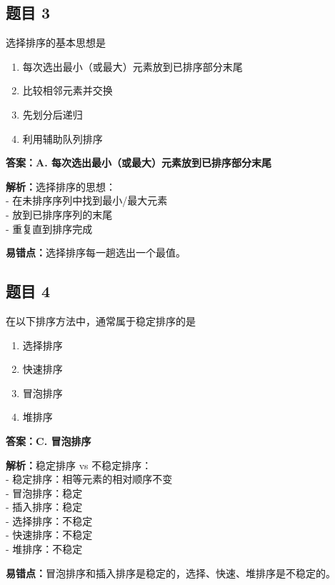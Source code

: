 \documentclass[12pt,a4paper]{ctexart}
\begin{document}
\subsection*{题目 3}
选择排序的基本思想是
\begin{enumerate}[label=\Alph*.]
	\item 每次选出最小（或最大）元素放到已排序部分末尾
	\item 比较相邻元素并交换
	\item 先划分后递归
	\item 利用辅助队列排序
\end{enumerate}

\begin{answerbox}
	\textbf{答案：A. 每次选出最小（或最大）元素放到已排序部分末尾}

	\textbf{解析：}选择排序的思想：\\
	- 在未排序序列中找到最小/最大元素\\
	- 放到已排序序列的末尾\\
	- 重复直到排序完成

	\textbf{易错点：}选择排序每一趟选出一个最值。
\end{answerbox}

\subsection*{题目 4}
在以下排序方法中，通常属于稳定排序的是
\begin{enumerate}[label=\Alph*.]
	\item 选择排序
	\item 快速排序
	\item 冒泡排序
	\item 堆排序
\end{enumerate}

\begin{answerbox}
	\textbf{答案：C. 冒泡排序}

	\textbf{解析：}稳定排序 vs 不稳定排序：\\
	- 稳定排序：相等元素的相对顺序不变\\
	- 冒泡排序：稳定\\
	- 插入排序：稳定\\
	- 选择排序：不稳定\\
	- 快速排序：不稳定\\
	- 堆排序：不稳定

	\textbf{易错点：}冒泡排序和插入排序是稳定的，选择、快速、堆排序是不稳定的。
\end{answerbox}
\end{document}
